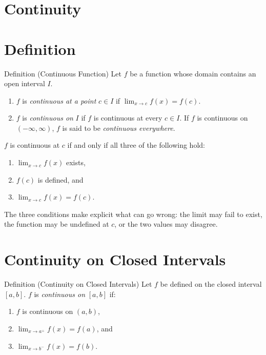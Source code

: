 \section{Continuity}

\section*{Definition}

\begin{propositionbox}{Definition (Continuous Function)}
Let $f$ be a function whose domain contains an open interval $I$.
\begin{enumerate}
  \item $f$ is \emph{continuous at a point} $c \in I$ if
        $\displaystyle\lim_{x \to c} f(x) = f(c)$.
  \item $f$ is \emph{continuous on} $I$ if $f$ is continuous at
        every $c \in I$. If $f$ is continuous on $(-\infty, \infty)$,
        $f$ is said to be \emph{continuous everywhere}.
\end{enumerate}
\end{propositionbox}

\begin{remark*}
$f$ is continuous at $c$ if and only if all three of the following hold:
\begin{enumerate}
  \item $\displaystyle\lim_{x \to c} f(x)$ exists,
  \item $f(c)$ is defined, and
  \item $\displaystyle\lim_{x \to c} f(x) = f(c)$.
\end{enumerate}
The three conditions make explicit what can go wrong: the limit may
fail to exist, the function may be undefined at $c$, or the two
values may disagree.
\end{remark*}

\section*{Continuity on Closed Intervals}

\begin{propositionbox}{Definition (Continuity on Closed Intervals)}
Let $f$ be defined on the closed interval $[a, b]$.
$f$ is \emph{continuous on} $[a, b]$ if:
\begin{enumerate}
  \item $f$ is continuous on $(a, b)$,
  \item $\displaystyle\lim_{x \to a^+} f(x) = f(a)$, and
  \item $\displaystyle\lim_{x \to b^-} f(x) = f(b)$.
\end{enumerate}
\end{propositionbox}

